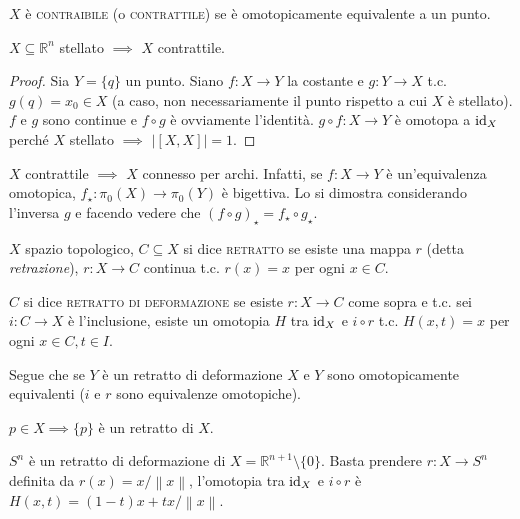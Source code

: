 \begin{defn}
  $X$ è \textsc{contraibile} (o \textsc{contrattile}) se è omotopicamente equivalente a un punto.
\end{defn}

\begin{prop}
  $X \subseteq \mathbb{R}^n$ stellato $\implies$ $X$ contrattile.
\end{prop}

\begin{proof}
  Sia $Y=\{q\}$ un punto. Siano $f: X \rightarrow Y$ la costante e $g:Y \rightarrow X$ t.c. $g(q)=x_0 \in X$ (a caso, non necessariamente il punto rispetto a cui $X$ è stellato). $f$ e $g$ sono continue e $f \circ g$ è ovviamente l'identità. $g \circ f:X \rightarrow Y$ è omotopa a $\operatorname{id}_X$ perché $X$ stellato $\implies$ $\left|[X, X]\right|=1$.
\end{proof}

\begin{oss}
  $X$ contrattile $\implies$ $X$ connesso per archi. Infatti, se $f:X \rightarrow Y$ è un'equivalenza omotopica, $f_{\star}: \pi_0(X) \rightarrow \pi_0(Y)$ è bigettiva. Lo si dimostra considerando l'inversa $g$ e facendo vedere che $(f \circ g)_{\star}=f_{\star} \circ g_{\star}$.
\end{oss}

\begin{defn}
  $X$ spazio topologico, $C \subseteq X$ si dice \textsc{retratto} se esiste una mappa $r$ (detta \textit{retrazione}), $r:X \rightarrow C$ continua t.c. $r(x)=x$ per ogni $x \in C$.

  $C$ si dice \textsc{retratto di deformazione} se esiste $r:X \rightarrow C$ come sopra e t.c. sei $i:C \rightarrow X$ è l'inclusione, esiste un omotopia $H$ tra $\operatorname{id}_X$ e $i \circ r$ t.c. $H(x, t)=x$ per ogni $x \in C, t \in I$.
\end{defn}

Segue che se $Y$ è un retratto di deformazione $X$ e $Y$ sono omotopicamente equivalenti ($i$ e $r$ sono equivalenze omotopiche).

\begin{ex}
  $p \in X \implies \{p\}$ è un retratto di $X$.
\end{ex}

\begin{ex}
  $S^n$ è un retratto di deformazione di $X=\mathbb{R}^{n+1} \setminus \{0\}$. Basta prendere $r: X \rightarrow S^n$ definita da $r(x)=x/\left\|x\right\|$, l'omotopia tra $\operatorname{id}_X$ e $i \circ r$ è $H(x, t)=(1-t)x+tx/\left\|x\right\|$.
\end{ex}

